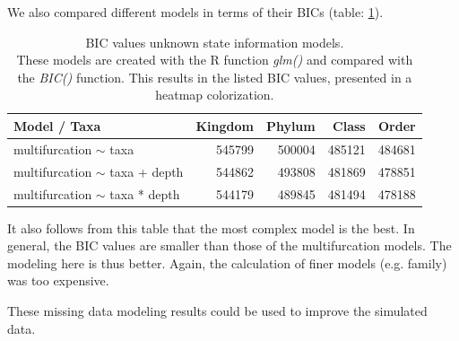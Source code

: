       We also compared different models in terms of their BICs (table: \ref{table:BIC unknown information}). \\ 
      \begin{table}[h!]
        \begin{center}
          \begin{tabular}{ |l|r|r|r|r| }
            \hline
            \bfseries Model / Taxa & \bfseries Kingdom & \bfseries Phylum & \bfseries Class & \bfseries Order \\
            \hline \hline
            multifurcation $\sim$ taxa & {\cellcolor{green!15}}545799 & {\cellcolor{green!35}}500004 & {\cellcolor{green!45}}485121 & {\cellcolor{green!45}}484681 \\
            \hline
            multifurcation $\sim$ taxa + depth & {\cellcolor{green!15}}544862 & {\cellcolor{green!40}}493808 & {\cellcolor{green!45}}481869 & {\cellcolor{green!50}}478851 \\
            \hline
            multifurcation $\sim$ taxa * depth & {\cellcolor{green!15}}544179 & {\cellcolor{green!45}}489845 & {\cellcolor{green!45}}481494 & {\cellcolor{green!50}}478188 \\
            \hline
          \end{tabular} 
        \end{center}
        \caption{BIC values unknown state information models. \\
          These models are created with the R function \textit{glm()} and compared with the 
            \textit{BIC()} function. This results in the listed BIC values, presented in a heatmap colorization.}
        \label{table:BIC unknown information} 
      \end{table}

      It also follows from this table that the most complex model is the best. In general, the BIC 
        values are smaller than those of the multifurcation models. The modeling here is thus better.
        Again, the calculation of finer models (e.g. family) was too expensive.

      These missing data modeling results could be used to improve the simulated data. \\

\newpage

